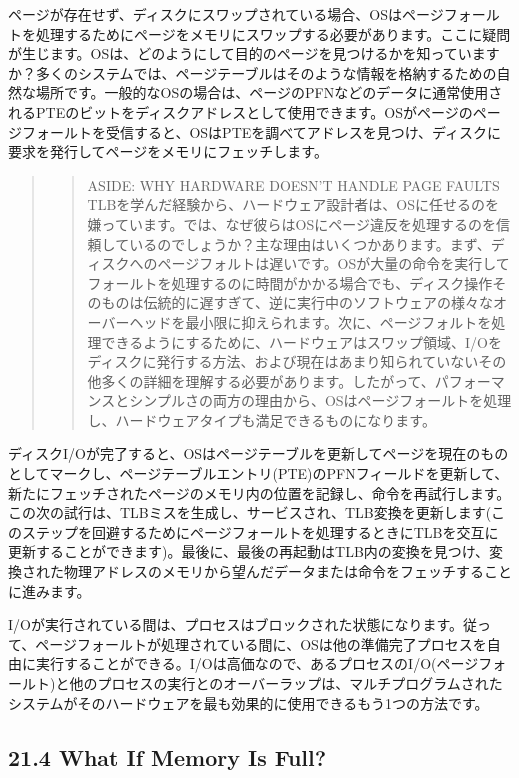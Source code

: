 ページが存在せず、ディスクにスワップされている場合、OSはページフォールトを処理するためにページをメモリにスワップする必要があります。ここに疑問が生じます。OSは、どのようにして目的のページを見つけるかを知っていますか？多くのシステムでは、ページテーブルはそのような情報を格納するための自然な場所です。一般的なOSの場合は、ページのPFNなどのデータに通常使用されるPTEのビットをディスクアドレスとして使用できます。OSがページのページフォールトを受信すると、OSはPTEを調べてアドレスを見つけ、ディスクに要求を発行してページをメモリにフェッチします。

\begin{quote}
\begin{quote}
ASIDE: WHY HARDWARE DOESN'T HANDLE PAGE FAULTS\\
TLBを学んだ経験から、ハードウェア設計者は、OSに任せるのを嫌っています。では、なぜ彼らはOSにページ違反を処理するのを信頼しているのでしょうか？主な理由はいくつかあります。まず、ディスクへのページフォルトは遅いです。OSが大量の命令を実行してフォールトを処理するのに時間がかかる場合でも、ディスク操作そのものは伝統的に遅すぎて、逆に実行中のソフトウェアの様々なオーバーヘッドを最小限に抑えられます。次に、ページフォルトを処理できるようにするために、ハードウェアはスワップ領域、I/Oをディスクに発行する方法、および現在はあまり知られていないその他多くの詳細を理解する必要があります。したがって、パフォーマンスとシンプルさの両方の理由から、OSはページフォールトを処理し、ハードウェアタイプも満足できるものになります。
\end{quote}
\end{quote}

ディスクI/Oが完了すると、OSはページテーブルを更新してページを現在のものとしてマークし、ページテーブルエントリ(PTE)のPFNフィールドを更新して、新たにフェッチされたページのメモリ内の位置を記録し、命令を再試行します。この次の試行は、TLBミスを生成し、サービスされ、TLB変換を更新します(このステップを回避するためにページフォールトを処理するときにTLBを交互に更新することができます)。最後に、最後の再起動はTLB内の変換を見つけ、変換された物理アドレスのメモリから望んだデータまたは命令をフェッチすることに進みます。

I/Oが実行されている間は、プロセスはブロックされた状態になります。従って、ページフォールトが処理されている間に、OSは他の準備完了プロセスを自由に実行することができる。I/Oは高価なので、あるプロセスのI/O(ページフォールト)と他のプロセスの実行とのオーバーラップは、マルチプログラムされたシステムがそのハードウェアを最も効果的に使用できるもう1つの方法です。

\hypertarget{what-if-memory-is-full}{%
\subsection*{21.4 What If Memory Is Full?}\label{what-if-memory-is-full}}

